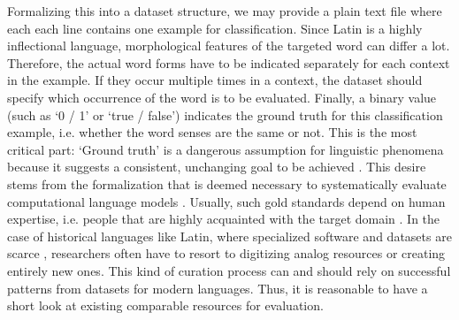 \documentclass[runningheads]{llncs}
\begin{document}
Formalizing this into a dataset structure, we may provide a plain text file where each each line contains one example for classification. Since Latin is a highly inflectional language, morphological features of the targeted word can differ a lot. Therefore, the actual word forms have to be indicated separately for each context in the example. If they occur multiple times in a context, the dataset should specify which occurrence of the word is to be evaluated. Finally, a binary value (such as `0 / 1' or `true / false') indicates the ground truth for this classification example, i.e. whether the word senses are the same or not. This is the most critical part: `Ground truth' is a dangerous assumption for linguistic phenomena because it suggests a consistent, unchanging goal to be achieved \parencite[129]{leeGeneratingGroundTruth2012}. This desire stems from the formalization that is deemed necessary to systematically evaluate computational language models \parencite[4]{fischerGroundTruthCreation2010}. Usually, such gold standards depend on human expertise, i.e. people that are highly acquainted with the target domain \parencite[519]{uzunerCommunityAnnotationExperiment2010}. In the case of historical languages like Latin, where specialized software and datasets are scarce \parencites[168]{karakantaNeuralMachineTranslation2018}[3]{mcgillivrayMethodsLatinComputational2013}, researchers often have to resort to digitizing analog resources or creating entirely new ones. This kind of curation process can and should rely on successful patterns from datasets for modern languages. Thus, it is reasonable to have a short look at existing comparable resources for evaluation.
\end{document}
